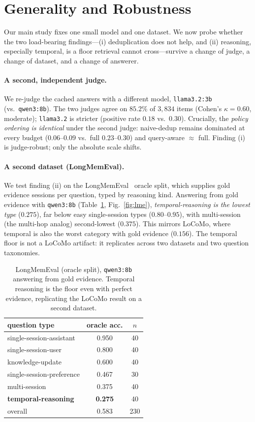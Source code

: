 \section{Generality and Robustness}
\label{sec:generality}

Our main study fixes one small model and one dataset. We now probe whether the
two load-bearing findings---(i) deduplication does not help, and (ii) reasoning,
especially temporal, is a floor retrieval cannot cross---survive a change of
judge, a change of dataset, and a change of answerer.

\paragraph{A second, independent judge.} We re-judge the cached answers with a
different model, \texttt{llama3.2:3b} (vs.\ \texttt{qwen3:8b}). The two judges
agree on $85.2\%$ of $3{,}834$ items (Cohen's $\kappa = 0.60$, moderate);
\texttt{llama3.2} is stricter (positive rate $0.18$ vs.\ $0.30$). Crucially, the
\emph{policy ordering is identical} under the second judge: naive-dedup remains
dominated at every budget ($0.06$--$0.09$ vs.\ full $0.23$--$0.30$) and
query-aware $\approx$ full. Finding (i) is judge-robust; only the absolute scale
shifts.

\paragraph{A second dataset (LongMemEval).} We test finding (ii) on the
LongMemEval~\cite{wu2024longmemeval} oracle split, which supplies gold evidence
sessions per question, typed by reasoning kind. Answering from gold evidence
with \texttt{qwen3:8b} (Table~\ref{tab:lme}, Fig.~\ref{fig:lme}),
\emph{temporal-reasoning is the lowest type} ($0.275$), far below easy
single-session types ($0.80$--$0.95$), with multi-session (the multi-hop analog)
second-lowest ($0.375$). This mirrors LoCoMo, where temporal is also the worst
category with gold evidence ($0.156$). The temporal floor is not a LoCoMo
artifact: it replicates across two datasets and two question taxonomies.

\begin{table}[t]
\centering
\small
\begin{tabular}{lcc}
\toprule
question type & oracle acc. & $n$ \\
\midrule
single-session-assistant & 0.950 & 40 \\
single-session-user & 0.800 & 40 \\
knowledge-update & 0.600 & 40 \\
single-session-preference & 0.467 & 30 \\
multi-session & 0.375 & 40 \\
\textbf{temporal-reasoning} & \textbf{0.275} & 40 \\
\midrule
overall & 0.583 & 230 \\
\bottomrule
\end{tabular}
\caption{LongMemEval (oracle split), \texttt{qwen3:8b} answering from gold
evidence. Temporal reasoning is the floor even with perfect evidence,
replicating the LoCoMo result on a second dataset.}
\label{tab:lme}
\end{table}

